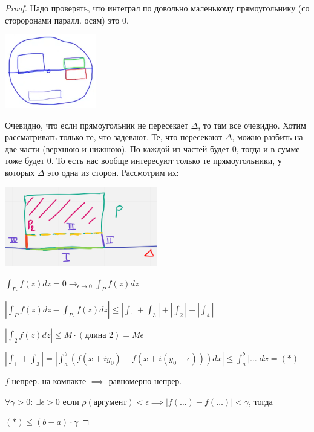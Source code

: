 \begin{proof}
    Надо проверять, что интеграл по довольно маленькому прямоугольнику (со стороронами паралл. осям) это 0.

    \begin{center}
        \includegraphics*[width=0.3\textwidth]{assets/04-functions-of-complex-variables/interesting-rectangles-locally-exact-form-without-line.png}
    \end{center}

    Очевидно, что если прямоугольник не пересекает $\Delta$, то там все очевидно. Хотим рассматривать только те, что задевают. Те, что пересекают $\Delta$, можно разбить на две части (верхнюю и нижнюю). По каждой из частей будет 0, тогда и в сумме тоже будет 0. То есть нас вообще интересуют только те прямоугольники, у которых $\Delta$ это одна из сторон. Рассмотрим их:
    
    \begin{center}
        \includegraphics*[width=0.5\textwidth]{assets/04-functions-of-complex-variables/smaller-rectangle-locally-exact-form-without-line.png}
    \end{center}

    $\int_{P_{\epsilon}} { f(z) d z } = 0 \rightarrow_{\epsilon \rightarrow 0} \int_{P} { f(z) dz }$

    $\left|\int_{P} {f(z) dz} - \int_{P_{\epsilon}} { f(z) dz } \right| \leq |\int_{1} + \int_{3}| + |\int_{2}| + |\int_{4}|$

    $\left| \int_{2} {f(z) dz} \right| \leq M \cdot (\text{длина } 2) = M \epsilon$

    $\left| \int_{1} + \int_{3} \right| = \left| \int_{a}^{b} { \left(f (x + i y_0) - f(x + i(y_0 + \epsilon)) \right) dx } \right| \leq \int_{a}^{b} { |\dots| dx } = (*)$

    $f$ непрер. на компакте $\implies$ равномерно непрер.

    $\forall \gamma > 0: \ \exists \epsilon > 0$ если $\rho (\text{аргумент}) < \epsilon \implies |f(\dots) - f(\dots)| < \gamma$, тогда 

    $(*) \leq (b - a) \cdot \gamma$
\end{proof}

